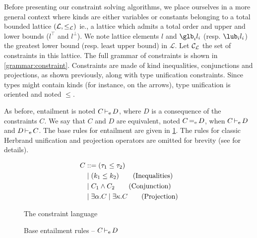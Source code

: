 \newcommand\A{\mathcal A}
\newcommand\SC{\mathcal S}

Before presenting our constraint solving algorithms,
we place ourselves in a more general context where kinds are either variables
or constants belonging to a total bounded lattice $(\mathcal L, \leq_\mathcal L)$ ie.,
a lattice which admits a total order and upper and lower bounds ($l^\top$ and $l^\bot$).
We note lattice elements $l$ and $\glb_i l_i$ (resp. $\lub_i l_i$)
the greatest lower bound (resp. least upper bound) in $\mathcal L$.
%
Let ${\mathcal C_{\mathcal L}}$ the set of constraints in this lattice.
The full grammar of constraints is shown in \cref{grammar:constraint}.
Constraints are made of kind inequalities, conjunctions and
projections, as shown previously, along with type unification
constraints. Since types might contain kinds (for instance, on the arrows),
type unification is oriented and noted $\leq$.

As before, entailment is noted $C \operatorname{\vdash_e} D$,
where $D$ is a consequence of the constraints $C$.
We say that $C$ and $D$ are equivalent, noted $C \operatorname{=_e} D$,
when $C \operatorname{\vdash_e} D$ and $D \operatorname{\vdash_e} C$.
The base rules for entailment are given in \cref{rules:entail}.
The rules for classic Herbrand unification and
projection operators are omitted for brevity (see
\citep{DBLP:journals/tapos/OderskySW99} for
details).

\begin{figure}[!h]
  \centering
  \begin{minipage}{0.32\linewidth}
    \begin{align*}
      C &::= (\tau_1 \leq \tau_2) \\
        &\mid (k_1 \leq k_2) \tag{Inequalities} \\
        &\mid C_1 \wedge C_2  \tag{Conjunction}\\
        &\mid \exists \alpha.C 
        \mid \exists \kappa.C \tag{Projection} 
    \end{align*}
    \caption{The constraint language}
    \label{grammar:constraint}
  \end{minipage}\hfill
  \begin{minipage}{0.64\linewidth}
    \caption{Base entailment rules -- $C \operatorname{\vdash_e} D$ }
    \label{rules:entail}
  \end{minipage}
\end{figure}


